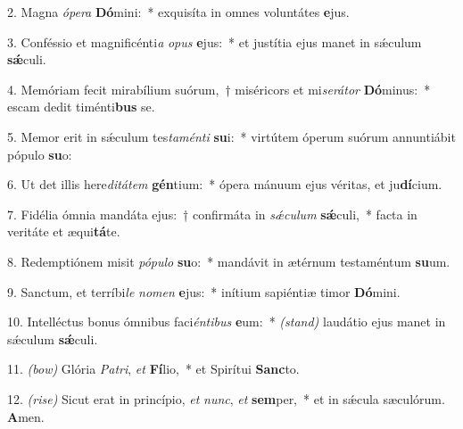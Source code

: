 2. Magna \textit{ó}\textit{pe}\textit{ra} \textbf{Dó}mini:~* exquisíta in omnes voluntátes \textbf{e}jus.

3. Conféssio et magnificénti\textit{a} \textit{o}\textit{pus} \textbf{e}jus:~* et justítia ejus manet in sǽculum \textbf{sǽ}culi.

4. Memóriam fecit mirabílium suórum,~† miséricors et mi\textit{se}\textit{rá}\textit{tor} \textbf{Dó}minus:~* escam dedit timénti\textbf{bus} se.

5. Memor erit in sǽculum tes\textit{ta}\textit{mén}\textit{ti} \textbf{su}i:~* virtútem óperum suórum annuntiábit pópulo \textbf{su}o:

6. Ut det illis here\textit{di}\textit{tá}\textit{tem} \textbf{gén}tium:~* ópera mánuum ejus véritas, et ju\textbf{dí}cium.

7. Fidélia ómnia mandáta ejus:~† confirmáta in \textit{sǽ}\textit{cu}\textit{lum} \textbf{sǽ}culi,~* facta in veritáte et æqui\textbf{tá}te.

8. Redemptiónem misit \textit{pó}\textit{pu}\textit{lo} \textbf{su}o:~* mandávit in ætérnum testaméntum \textbf{su}um.

9. Sanctum, et terríbi\textit{le} \textit{no}\textit{men} \textbf{e}jus:~* inítium sapiéntiæ timor \textbf{Dó}mini.

10. Intelléctus bonus ómnibus faci\textit{én}\textit{ti}\textit{bus} \textbf{e}um:~* {\color{red}\textit{(stand)}} laudátio ejus manet in sǽculum \textbf{sǽ}culi.

11. {\color{red}\textit{(bow)}} Glória \textit{Pa}\textit{tri}, \textit{et} \textbf{Fí}lio,~* et Spirítui \textbf{Sanc}to.

12. {\color{red}\textit{(rise)}} Sicut erat in princípio, \textit{et} \textit{nunc}, \textit{et} \textbf{sem}per,~* et in sǽcula sæculórum. \textbf{A}men.